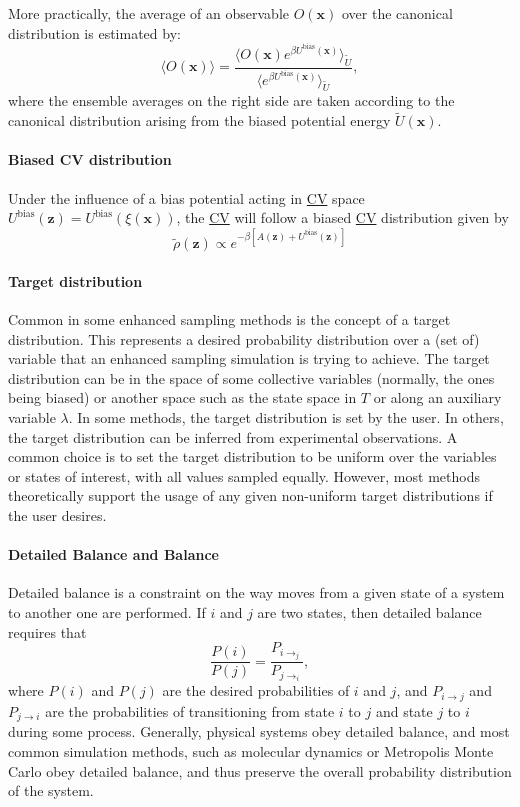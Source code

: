\documentclass[9pt,review]{livecoms}
\newcommand{\vx}{\mathbf{x}}
\newcommand{\vz}{\mathbf{z}}
\begin{document}
More practically, the average of an observable $O(\vx)$ over the canonical distribution is estimated by:
\begin{equation}
\langle O(\vx) \rangle = \frac{\langle O(\vx) e^{\beta U^\mathrm{bias}(\vx)} \rangle_{\tilde U}}
{\langle e^{\beta U^\mathrm{bias}(\vx)} \rangle_{\tilde U}},
\end{equation}
where the ensemble averages on the right side are taken according to the canonical distribution arising from the biased potential energy $\tilde U(\vx)$.


\paragraph{Biased CV distribution}
Under the influence of a bias potential acting in \hyperlink{ref:CV} {CV} space $U^\mathrm{bias}(\vz)=U^\mathrm{bias}(\xi(\vx))$, the \hyperlink{ref:CV} {CV} will follow a biased \hyperlink{ref:CV} {CV} distribution given by
\begin{equation}
\tilde \rho(\vz) \propto e^{-\beta \left[
A(\vz) + U^\mathrm{bias}(\vz)
\right]}
\end{equation}

\hypertarget{ref:targetdist}{\paragraph{Target distribution}}
Common in some enhanced sampling methods is the concept of a target distribution. This represents a desired probability distribution over a (set of) variable that an enhanced sampling simulation is trying to achieve. The target distribution can be in the space of some collective variables (normally, the ones being biased) or another space such as the state space in $T$ or along an auxiliary variable $\lambda$. In some methods, the target distribution is set by the user. In others, the target distribution can be inferred from experimental observations. A common choice is to set the target distribution to be uniform over the variables or states of interest, with all values sampled equally. However, most methods theoretically support the usage of any given non-uniform target distributions if the user desires.

\hypertarget{ref:Balance} {\paragraph{Detailed Balance and Balance}}
Detailed balance is a constraint on the way moves from a given state of a system to another one are performed.  If $i$ and $j$ are two states, then detailed balance requires that
\begin{equation}
\frac{P(i)}{P(j)} = \frac{P_{i\rightarrow_j}}{P_{j\rightarrow_i}},    
\end{equation}
where $P(i)$ and $P(j)$ are the desired probabilities of $i$ and $j$, and $P_{i\rightarrow j}$ and $P_{j\rightarrow i}$ are the probabilities of transitioning from state $i$ to $j$ and state $j$ to $i$ during some process.
Generally, physical systems obey detailed balance, and most common simulation methods, such as molecular dynamics or Metropolis Monte Carlo obey detailed balance, and thus preserve the overall probability distribution of the system.
\end{document}
